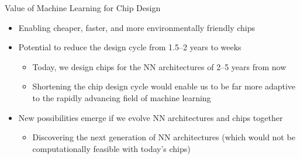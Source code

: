\begin{frame}{Value of Machine Learning for Chip Design}
\begin{itemize}
    \item Enabling cheaper, faster, and more environmentally friendly chips
    \item Potential to reduce the design cycle from 1.5--2 years to weeks
    \begin{itemize}
        \item Today, we design chips for the NN architectures of 2--5 years from now
        \item Shortening the chip design cycle would enable us to be far more adaptive
              to the rapidly advancing field of machine learning
    \end{itemize}
    \item New possibilities emerge if we evolve NN architectures and chips together
    \begin{itemize}
        \item Discovering the next generation of NN architectures (which would not be
              computationally feasible with today's chips)
    \end{itemize}
\end{itemize}
\end{frame}

